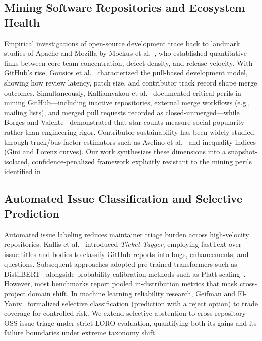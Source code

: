 \documentclass[conference]{IEEEtran}
\begin{document}
\subsection{Mining Software Repositories and Ecosystem Health}
Empirical investigations of open-source development trace back to landmark studies of Apache and Mozilla by Mockus et al.~\cite{mockus2002case}, who established quantitative links between core-team concentration, defect density, and release velocity. With GitHub's rise, Gousios et al.~\cite{gousios2014pull} characterized the pull-based development model, showing how review latency, patch size, and contributor track record shape merge outcomes. Simultaneously, Kalliamvakou et al.~\cite{kalliamvakou2014promises} documented critical perils in mining GitHub---including inactive repositories, external merge workflows (e.g., mailing lists), and merged pull requests recorded as closed-unmerged---while Borges and Valente~\cite{borges2018github} demonstrated that star counts measure social popularity rather than engineering rigor. Contributor sustainability has been widely studied through truck/bus factor estimators such as Avelino et al.~\cite{avelino2016truck} and inequality indices (Gini and Lorenz curves). Our work synthesizes these dimensions into a snapshot-isolated, confidence-penalized framework explicitly resistant to the mining perils identified in~\cite{kalliamvakou2014promises}.

\subsection{Automated Issue Classification and Selective Prediction}
Automated issue labeling reduces maintainer triage burden across high-velocity repositories. Kallis et al.~\cite{kallis2019ticket} introduced \emph{Ticket Tagger}, employing fastText over issue titles and bodies to classify GitHub reports into bugs, enhancements, and questions. Subsequent approaches adopted pre-trained transformers such as DistilBERT~\cite{sanh2019distilbert} alongside probability calibration methods such as Platt scaling~\cite{platt1999probabilistic}. However, most benchmarks report pooled in-distribution metrics that mask cross-project domain shift. In machine learning reliability research, Geifman and El-Yaniv~\cite{geifman2017selective} formalized selective classification (prediction with a reject option) to trade coverage for controlled risk. We extend selective abstention to cross-repository OSS issue triage under strict LORO evaluation, quantifying both its gains and its failure boundaries under extreme taxonomy shift.
\end{document}
